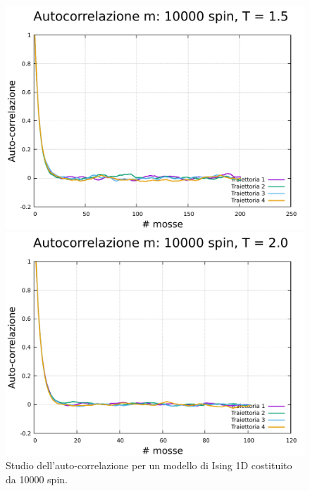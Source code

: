 \begin{figure}[htbp]
    \begin{minipage}{0.45\textwidth}  
      \centering
      \includegraphics[page=1, width=\textwidth]{Immagini/simIsing1D/magn0.02/tcorr/tcorr_10000_1.5.pdf}
      \caption{$T\,=\,1.5$}
    \end{minipage}\hfill
    \begin{minipage}{0.45\textwidth}  
      \centering
      \includegraphics[page=1, width=\textwidth]{Immagini/simIsing1D/magn0.02/tcorr/tcorr_10000_2.0.pdf}
      \caption{$T\,=\,2.0$}
    \end{minipage}
    \caption{Studio dell'auto-correlazione per un modello di Ising 1D costituito da 10000 spin.}
\end{figure}

